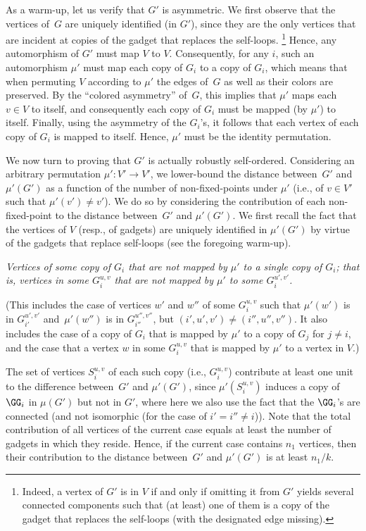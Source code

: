 \BPF
As a warm-up, let us verify that $G'$ is asymmetric.
We first observe that the vertices of~$G$ are uniquely identified
(in $G'$), since they are the only vertices that are incident at copies
of the gadget that replaces the self-loops.
%
%
\footnote{Indeed, a vertex of $G'$ is in $V$ if and only if
omitting it from $G'$ yields several connected components
such that (at least) one of them is a copy of the gadget
that replaces the self-loops (with the designated edge missing).}
%
Hence, any automorphism of $G'$ must map $V$ to $V$.
Consequently, for any $i$, such an automorphism $\mu'$
must map each copy of $G_i$ to a copy of $G_i$,
which means that when permuting $V$ according to $\mu'$
the edges of~$G$ as well as their colors are preserved.
%
By the ``colored asymmetry'' of~$G$,
this implies that $\mu'$ maps each $v\in V$ to itself,
and consequently each copy of $G_i$ must be mapped (by $\mu'$) to itself.
Finally, using the asymmetry of the $G_i$'s,
it follows that each vertex of each copy of $G_i$ is mapped to itself.
Hence, $\mu'$ must be the identity permutation.

We now turn to proving that $G'$ is actually robustly self-ordered.
%
%
%
%
%
%
%
Considering an arbitrary permutation $\mu':V'\to V'$,
we lower-bound the distance between~$G'$ and $\mu'(G')$
as a function of the number of non-fixed-points under $\mu'$
(i.e., of $v\in V'$ such that $\mu'(v')\neq v'$).
We do so by considering the contribution
of each non-fixed-point to the distance between~$G'$ and $\mu'(G')$.
We first recall the fact that the vertices of $V$
(resp., of gadgets) are uniquely identified in $\mu'(G')$
by virtue of the gadgets that replace self-loops
(see the foregoing warm-up).
%
%
%
%

\BDes
\item[{\em Case 1}:] {\em Vertices of some copy of $G_i$
that are not mapped by $\mu'$ to a single copy of $G_i$;
that is, vertices in some $G_i^{u,v}$ that are not
mapped by $\mu'$ to some $G_i^{u',v'}$.}

(This includes the case of vertices $w'$ and $w''$ of some $G_i^{u,v}$
such that $\mu'(w')$ is in $G_{i'}^{u',v'}$
and~$\mu'(w'')$ is in $G_{i''}^{u'',v''}$,
but $(i',u',v')\neq(i'',u'',v'')$.
It also includes the case of a copy of $G_i$ that is mapped by $\mu'$
to a copy of $G_j$ for $j\neq i$,
and the case that a vertex $w$ in some $G_i^{u,v}$
that is mapped by $\mu'$ to a vertex in $V$.)

%
%
%
%
The set of vertices $S_i^{u,v}$ of each such copy (i.e., $G_i^{u,v}$)
contribute at least one unit to the difference between~$G'$ and $\mu'(G')$,
since $\mu'(S_i^{u,v})$ induces a copy of $\GG_i$ in $\mu(G')$
but not in $G'$,
where here we also use the fact that the $\GG_i$'s are connected
(and not isomorphic (for the case of $i'=i''\neq i$)).
%
%
%
%
%
%
%
%
%
%
%
%
%
Note that the total contribution of all vertices of the current case
equals at least the number of gadgets in which they reside.
Hence, if the current case contains $n_1$ vertices,
then their contribution to the distance between~$G'$ and $\mu'(G')$
is at least $n_1/k$.

